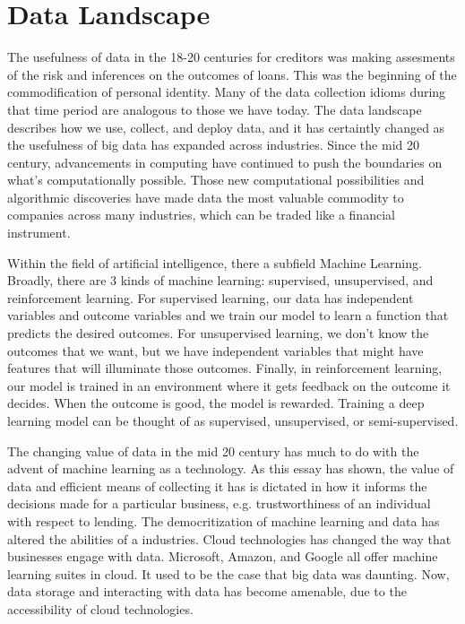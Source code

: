 \section{Data Landscape}
The usefulness of data in the 18-20 centuries for creditors was making
assesments of the risk and inferences on the outcomes of loans. This was the
beginning of the commodification of personal identity. Many of the data
collection idioms during that time period are analogous to those we have today.
The data landscape describes how we use, collect, and deploy data, and it
has certaintly changed as the usefulness of big data has
expanded across industries. Since the mid 20 century, advancements in
computing have continued to push the boundaries on what's computationally
possible. Those new computational possibilities and algorithmic discoveries
have made data the most valuable commodity to companies across many industries,
which can be traded like a financial instrument.

Within the field of artificial intelligence, there a subfield Machine Learning.
Broadly, there are 3 kinds of machine learning: supervised, unsupervised, and
reinforcement learning. For supervised learning, our data has independent
variables and outcome variables and we train our model to learn a function that
predicts the desired outcomes. For unsupervised learning, we don't know the
outcomes that we want, but we have independent variables that might have
features that will illuminate those outcomes. Finally, in reinforcement
learning, our model is trained in an environment where it gets feedback on the
outcome it decides. When the outcome is good, the model is rewarded.
Training a deep learning model can be thought of as supervised, unsupervised, or semi-supervised.

The changing value of data in the mid 20 century has much to do with the
advent of machine learning as a technology. As this essay has shown, the value
of data and efficient means of collecting it has is dictated in how it informs
the decisions made for a particular business, e.g. trustworthiness of an individual with respect to lending.
The democritization of machine learning and data has altered the abilities of
a industries. Cloud technologies has changed the way that businesses engage with data.
Microsoft, Amazon, and Google all offer machine learning suites in cloud.
It used to be the case that big data was daunting. Now, data storage and interacting
with data has become amenable, due to the accessibility of cloud technologies.



